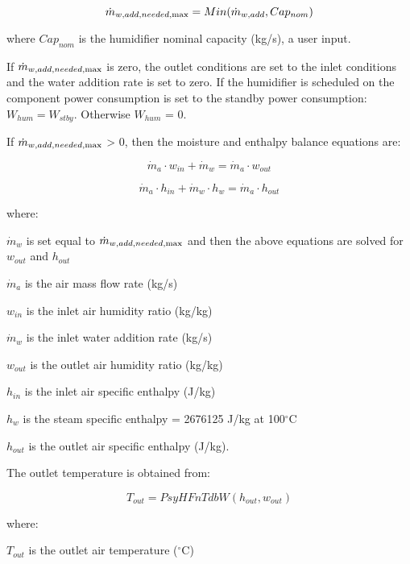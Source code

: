 \begin{equation}
{\dot m_{w,add,needed,{\rm{max}}}} = Min({\dot m_{w,add}},Ca{p_{nom}})
\end{equation}

where \(Ca{p_{nom}}\) is the humidifier nominal capacity (kg/s), a user input.

If \({\dot m_{w,add,needed,{\rm{max}}}}\) is zero, the outlet conditions are set to the inlet conditions and the water addition rate is set to zero. If the humidifier is scheduled on the component power consumption is set to the standby power consumption: \({W_{hum}} = {W_{stby}}\). Otherwise \({W_{hum}}\) = 0.

If \({\dot m_{w,add,needed,{\rm{max}}}}\) \textgreater{} 0, then the moisture and enthalpy balance equations are:

\begin{equation}
{\dot m_a} \cdot {w_{in}} + {\dot m_w} = {\dot m_a} \cdot {w_{out}}
\end{equation}

\begin{equation}
{\dot m_a} \cdot {h_{in}} + {\dot m_w} \cdot {h_w} = {\dot m_a} \cdot {h_{out}}
\end{equation}

where:

\({\dot m_w}\) is set equal to \({\dot m_{w,add,needed,{\rm{max}}}}\) and then the above equations are solved for \({w_{out}}\) and \({h_{out}}\)

\({\dot m_a}\) is the air mass flow rate (kg/s)

\({w_{in}}\) is the inlet air humidity ratio (kg/kg)

\({\dot m_w}\) is the inlet water addition rate (kg/s)

\({w_{out}}\) is the outlet air humidity ratio (kg/kg)

\({h_{in}}\) is the inlet air specific enthalpy (J/kg)

\({h_w}\) is the steam specific enthalpy = 2676125 J/kg at 100\(^{\circ}\)C

\({h_{out}}\) is the outlet air specific enthalpy (J/kg).

The outlet temperature is obtained from:

\begin{equation}
{T_{out}} = PsyHFnTdbW({h_{out}},{w_{out}})
\end{equation}

where:

\({T_{out}}\) is the outlet air temperature (\(^{\circ}\)C)

